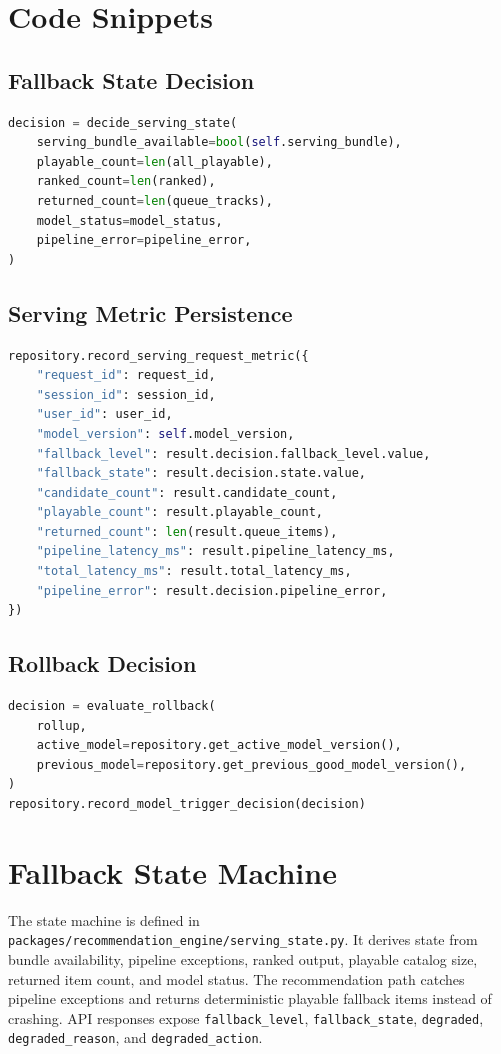 \documentclass[11pt]{article}
\begin{document}
\section*{Code Snippets}
\subsection*{Fallback State Decision}
\begin{lstlisting}[language=Python]
decision = decide_serving_state(
    serving_bundle_available=bool(self.serving_bundle),
    playable_count=len(all_playable),
    ranked_count=len(ranked),
    returned_count=len(queue_tracks),
    model_status=model_status,
    pipeline_error=pipeline_error,
)
\end{lstlisting}

\subsection*{Serving Metric Persistence}
\begin{lstlisting}[language=Python]
repository.record_serving_request_metric({
    "request_id": request_id,
    "session_id": session_id,
    "user_id": user_id,
    "model_version": self.model_version,
    "fallback_level": result.decision.fallback_level.value,
    "fallback_state": result.decision.state.value,
    "candidate_count": result.candidate_count,
    "playable_count": result.playable_count,
    "returned_count": len(result.queue_items),
    "pipeline_latency_ms": result.pipeline_latency_ms,
    "total_latency_ms": result.total_latency_ms,
    "pipeline_error": result.decision.pipeline_error,
})
\end{lstlisting}

\subsection*{Rollback Decision}
\begin{lstlisting}[language=Python]
decision = evaluate_rollback(
    rollup,
    active_model=repository.get_active_model_version(),
    previous_model=repository.get_previous_good_model_version(),
)
repository.record_model_trigger_decision(decision)
\end{lstlisting}

\section*{Fallback State Machine}
The state machine is defined in \texttt{packages/recommendation\_engine/serving\_state.py}. It derives state from bundle availability, pipeline exceptions, ranked output, playable catalog size, returned item count, and model status. The recommendation path catches pipeline exceptions and returns deterministic playable fallback items instead of crashing. API responses expose \texttt{fallback\_level}, \texttt{fallback\_state}, \texttt{degraded}, \texttt{degraded\_reason}, and \texttt{degraded\_action}.
\end{document}
